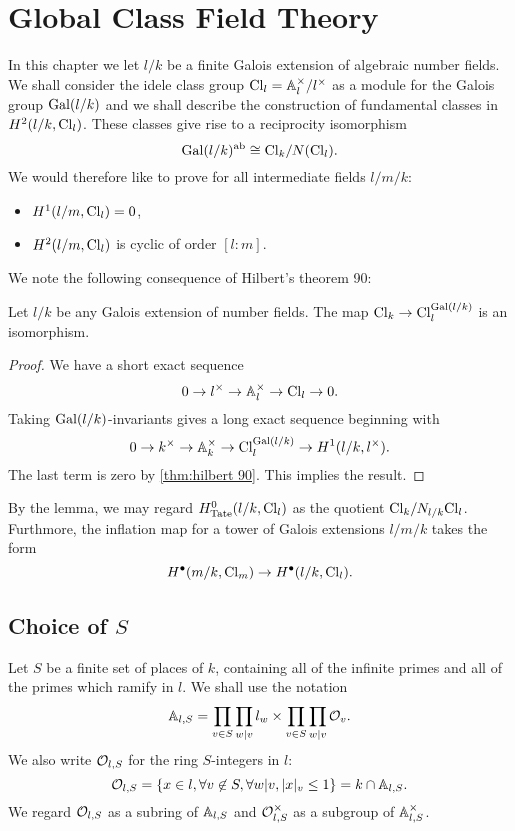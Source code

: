 \chapter{Global Class Field Theory}

In this chapter we let $l/k$ be a finite Galois extension of
algebraic number fields. We shall consider the idele class group $\mathrm{Cl}_l = {\mathbb A}_l^\times / l^\times$
as a module for the Galois group $\mathrm{Gal}(l/k)$ and we shall describe the construction of
fundamental classes in $H^2(l/k, \mathrm{Cl}_l)$.
These classes give rise to a reciprocity isomorphism
\[
	\mathrm{Gal}(l/k)^{\mathrm{ab}} \cong \mathrm{Cl}_k / N(\mathrm{Cl}_l).
\]
We would therefore like to prove for all intermediate fields $l / m / k$:
\begin{itemize}
	\item
	$H^1(l/m, \mathrm{Cl}_l) = 0$,
	\item
	$H^2(l/m, \mathrm{Cl}_l)$ is cyclic of order $[l:m]$.
\end{itemize}

We note the following consequence of Hilbert's theorem 90:

\begin{lemma} \label{lem:idele class invariants}
	Let $l/k$ be any Galois extension of number fields.
	The map $\mathrm{Cl}_k \to \mathrm{Cl}_l ^ {\mathrm{Gal}(l/k)}$ is an isomorphism.
\end{lemma}

\begin{proof}
	We have a short exact sequence
	\[
		0 \to l^\times \to {\mathbb A}_l^\times \to \mathrm{Cl}_l \to 0.
	\]
	Taking $\mathrm{Gal}(l/k)$-invariants gives a long exact sequence beginning with
	\[
		0 \to k^\times \to {\mathbb A}_k^\times \to \mathrm{Cl}_l^{\mathrm{Gal}(l/k)} \to H^1(l/k, l^\times).
	\]
	The last term is zero by \ref{thm:hilbert 90}. This implies the result.
\end{proof}

By the lemma, we may regard $H^0_{\mathrm{Tate}}(l/k,\mathrm{Cl}_l)$ as the quotient
$\mathrm{Cl}_k / N_{l/k} \mathrm{Cl}_l$.
Furthmore, the inflation map for a tower of Galois extensions $l/m/k$ takes the form
\[
	H^\bullet(m/k, \mathrm{Cl}_m) \to H^\bullet(l/k, \mathrm{Cl}_l).
\]







\section{Choice of $S$}

Let $S$ be a finite set of places of $k$, containing all of the infinite primes and all
of the primes which ramify in $l$.
We shall use the notation
\[
	{\mathbb A}_{l,S} = \prod_{v \in S} \prod_{w | v} l_w \times \prod_{v \in S} \prod_{w | v} {\mathcal O}_v.
\]
We also write ${\mathcal O}_{l,S}$ for the ring $S$-integers in $l$:
\[
	{\mathcal O}_{l,S} = \{x \in l, \forall v \not\in S, \forall w | v, |x|_v \le 1\} = k \cap {\mathbb A}_{l,S}.
\]
We regard ${\mathcal O}_{l,S}$ as a subring of ${\mathbb A}_{l,S}$ and
${\mathcal O}_{l,S}^\times$ as a subgroup of ${\mathbb A}_{l,S}^\times$.

